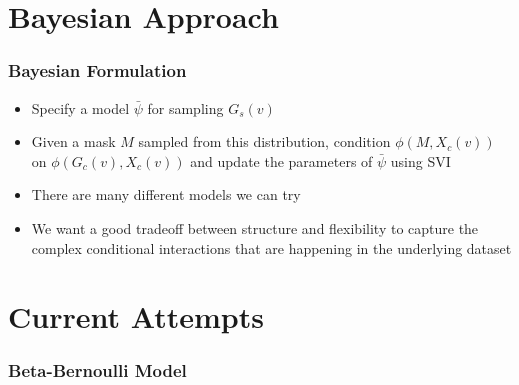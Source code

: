 \documentclass[11pt]{beamer}
\begin{document}
\section{Bayesian Approach}
\begin{frame}
    \frametitle{Bayesian Formulation}

    \begin{itemize}
        \item Specify a model $\bar{\psi}$ for sampling $G_s(v)$
        \item Given a mask $M$ sampled from this distribution, condition $\phi(M, X_c(v))$ on $\phi(G_c(v), X_c(v))$ and update the parameters of $\bar{\psi}$ using SVI
        \item There are many different models we can try
        \item We want a good tradeoff between structure and flexibility to capture the complex conditional interactions that are happening in the underlying dataset
    \end{itemize}
\end{frame}

\section{Current Attempts}
\begin{frame}
    \frametitle{Beta-Bernoulli Model}
\end{frame}
\end{document}

